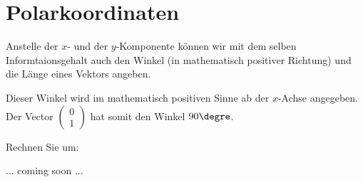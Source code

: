 
\section{Polarkoordinaten}

Anstelle der $x$- und der $y$-Komponente können wir mit dem selben
Informtaionsgehalt auch den Winkel
(in mathematisch positiver Richtung) und die Länge eines Vektors
angeben.

Dieser Winkel wird im mathematisch positiven Sinne ab der $x$-Achse
angegeben. Der Vector
$\begin{pmatrix}0\\1\end{pmatrix}$ hat somit den Winkel $90\degre$.

Rechnen Sie um:

... coming soon ...
